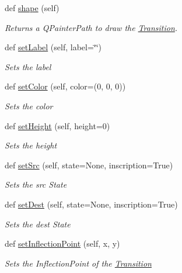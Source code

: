 \begin{DoxyCompactItemize}
\mbox{\label{classTransition_1_1Transition_ac335e5ce43e27ac18224ddd71f66439d}} 
def \mbox{\hyperlink{classTransition_1_1Transition_ac335e5ce43e27ac18224ddd71f66439d}{shape}} (self)
\begin{DoxyCompactList}\small\item\em Returns a Q\+Painter\+Path to draw the \mbox{\hyperlink{classTransition_1_1Transition}{Transition}}. \end{DoxyCompactList}\item 
def \mbox{\hyperlink{classTransition_1_1Transition_a736ddbe1e360e1c20e398582434d0585}{set\+Label}} (self, label=\char`\"{}\char`\"{})
\begin{DoxyCompactList}\small\item\em Sets the label   \end{DoxyCompactList}\item 
def \mbox{\hyperlink{classTransition_1_1Transition_a1e3d1da8e24b80ef43afa364c559fed8}{set\+Color}} (self, color=(0, 0, 0))
\begin{DoxyCompactList}\small\item\em Sets the color   \end{DoxyCompactList}\item 
def \mbox{\hyperlink{classTransition_1_1Transition_ae6ad9f99cb1df775514cda39f64b4a4f}{set\+Height}} (self, height=0)
\begin{DoxyCompactList}\small\item\em Sets the height   \end{DoxyCompactList}\item 
def \mbox{\hyperlink{classTransition_1_1Transition_a4f41a055992fab35a7e7237de4a18bf6}{set\+Src}} (self, state=None, inscription=True)
\begin{DoxyCompactList}\small\item\em Sets the src State   \end{DoxyCompactList}\item 
def \mbox{\hyperlink{classTransition_1_1Transition_af6c4e34a89833cb3c700bc918aaafde1}{set\+Dest}} (self, state=None, inscription=True)
\begin{DoxyCompactList}\small\item\em Sets the dest State   \end{DoxyCompactList}\item 
def \mbox{\hyperlink{classTransition_1_1Transition_a42224afec5eb79e2ced9d502d4470bcc}{set\+Inflection\+Point}} (self, x, y)
\begin{DoxyCompactList}\small\item\em Sets the Inflection\+Point of the \mbox{\hyperlink{classTransition_1_1Transition}{Transition}}   \end{DoxyCompactList}\item 

\end{DoxyCompactItemize}
